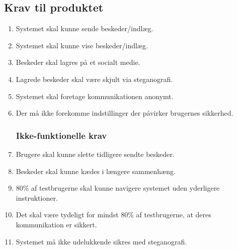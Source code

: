 \subsection{Krav til produktet}
\begin{enumerate}
  \subsubsection{Funktionelle krav}
    \item Systemet skal kunne sende beskeder/indlæg.
    \item Systemet skal kunne vise beskeder/indlæg.
    \item Beskeder skal lagres på et socialt medie.
    \item Lagrede beskeder skal være skjult via steganografi.
    \item Systemet skal foretage kommunikationen anonymt.
    \item Der må ikke forekomme indstillinger der påvirker brugernes sikkerhed.
  \subsubsection{Ikke-funktionelle krav}
    \item Brugere skal kunne slette tidligere sendte beskeder.
    \item Beskeder skal kunne kædes i længere sammenhæng.
    \item 80\% af testbrugerne skal kunne navigere systemet uden yderligere instruktioner.
    \item Det skal være tydeligt for mindst 80\% af testbrugerne, at deres kommunikation er sikkert.
    \item Systemet må ikke udelukkende sikres med steganografi.
\end{enumerate}